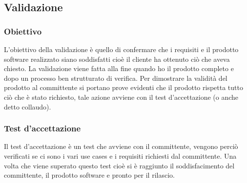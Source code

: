 \subsection{Validazione}
\subsubsection{Obiettivo}
L’obiettivo della validazione è quello di confermare che i requisiti e il prodotto software realizzato siano soddisfatti cioè il cliente ha ottenuto ciò che aveva chiesto. La validazione viene fatta alla fine quando ho il prodotto completo e dopo un processo ben strutturato di verifica. Per dimostrare la validità del prodotto al committente si portano prove evidenti che il prodotto rispetta tutto ciò che è stato richiesto, tale azione avviene con il test d’accettazione (o anche detto collaudo).

\subsubsection{Test d’accettazione} 
Il test d’accettazione è un test che avviene con il committente, vengono perciò verificati se ci sono i vari use cases e i requisiti richiesti dal committente. Una volta che viene superato questo test cioè si è raggiunto il soddisfacimento del committente, il prodotto software e pronto per il rilascio.